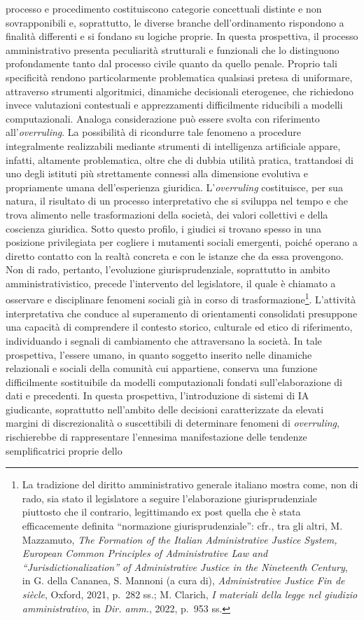 \documentclass[american,a4paper,]{article}
\begin{document}
processo e procedimento costituiscono categorie concettuali distinte e non sovrapponibili e, soprattutto, le diverse branche dell'ordinamento rispondono a finalità differenti e si fondano su logiche proprie. In questa prospettiva, il processo amministrativo presenta peculiarità strutturali e funzionali che lo distinguono profondamente tanto dal processo civile quanto da quello penale. Proprio tali specificità rendono particolarmente problematica qualsiasi pretesa di uniformare, attraverso strumenti algoritmici, dinamiche decisionali eterogenee, che richiedono invece valutazioni contestuali e apprezzamenti difficilmente riducibili a modelli computazionali. Analoga considerazione può essere svolta con riferimento all'\emph{overruling}. La possibilità di ricondurre tale fenomeno a procedure integralmente realizzabili mediante strumenti di intelligenza artificiale appare, infatti, altamente problematica, oltre che di dubbia utilità pratica, trattandosi di uno degli istituti più strettamente connessi alla dimensione evolutiva e propriamente umana dell'esperienza giuridica. L'\emph{overruling} costituisce, per sua natura, il risultato di un processo interpretativo che si sviluppa nel tempo e che trova alimento nelle trasformazioni della società, dei valori collettivi e della coscienza giuridica. Sotto questo profilo, i giudici si trovano spesso in una posizione privilegiata per cogliere i mutamenti sociali emergenti, poiché operano a diretto contatto con la realtà concreta e con le istanze che da essa provengono. Non di rado, pertanto, l'evoluzione giurisprudenziale, soprattutto in ambito amministrativistico, precede l'intervento del legislatore, il quale è chiamato a osservare e disciplinare fenomeni sociali già in corso di trasformazione\footnote{La tradizione del diritto amministrativo generale italiano mostra come, non di rado, sia stato il legislatore a seguire l'elaborazione giurisprudenziale piuttosto che il contrario, legittimando ex post quella che è stata efficacemente definita ``normazione giurisprudenziale'': cfr., tra gli altri, M. Mazzamuto, \emph{The Formation of the Italian Administrative Justice System, European Common Principles of Administrative Law and ``Jurisdictionalization'' of Administrative Justice in the Nineteenth Century}, in G. della Cananea, S. Mannoni (a cura di), \emph{Administrative Justice Fin de siècle}, Oxford, 2021, p.~282 ss.; M. Clarich, \emph{I materiali della legge nel giudizio amministrativo}, in \emph{Dir. amm.}, 2022, p.~953 ss.}. L'attività interpretativa che conduce al superamento di orientamenti consolidati presuppone una capacità di comprendere il contesto storico, culturale ed etico di riferimento, individuando i segnali di cambiamento che attraversano la società. In tale prospettiva, l'essere umano, in quanto soggetto inserito nelle dinamiche relazionali e sociali della comunità cui appartiene, conserva una funzione difficilmente sostituibile da modelli computazionali fondati sull'elaborazione di dati e precedenti. In questa prospettiva, l'introduzione di sistemi di IA giudicante, soprattutto nell'ambito delle decisioni caratterizzate da elevati margini di discrezionalità o suscettibili di determinare fenomeni di \emph{overruling}, rischierebbe di rappresentare l'ennesima manifestazione delle tendenze semplificatrici proprie dello 
\end{document}
